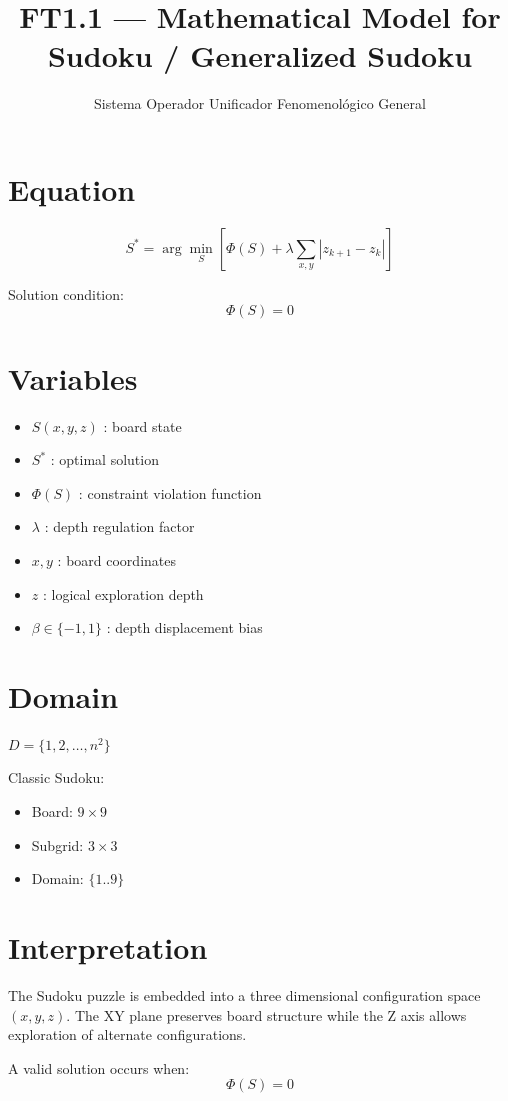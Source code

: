 \documentclass{article}
\title{FT1.1 — Mathematical Model for Sudoku / Generalized Sudoku}
\author{Sistema Operador Unificador Fenomenológico General}
\begin{document}
\maketitle

\section*{Equation}
\begin{equation}
S^* = \arg\min_S [ \Phi(S) + \lambda \sum_{x,y} |z_{k+1}-z_k| ]
\end{equation}

Solution condition:
\begin{equation}
\Phi(S) = 0
\end{equation}

\section*{Variables}
\begin{itemize}
\item $S(x,y,z)$ : board state
\item $S^*$ : optimal solution
\item $\Phi(S)$ : constraint violation function
\item $\lambda$ : depth regulation factor
\item $x,y$ : board coordinates
\item $z$ : logical exploration depth
\item $\beta \in \{-1,1\}$ : depth displacement bias
\end{itemize}

\section*{Domain}
$D = \{1,2,\dots,n^2\}$

Classic Sudoku:
\begin{itemize}
\item Board: $9\times9$
\item Subgrid: $3\times3$
\item Domain: $\{1..9\}$
\end{itemize}

\section*{Interpretation}
The Sudoku puzzle is embedded into a three dimensional configuration space $(x,y,z)$.
The XY plane preserves board structure while the Z axis allows exploration of alternate configurations.

A valid solution occurs when:
\begin{equation}
\Phi(S)=0
\end{equation}
\end{document}
